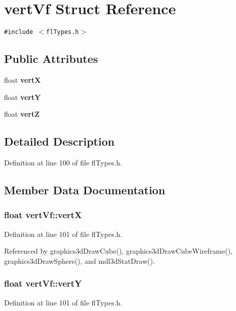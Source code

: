 \section{vert\-Vf Struct Reference}
\label{structvertVf}
{\tt \#include $<$fl\-Types.h$>$}

\subsection*{Public Attributes}
\begin{CompactItemize}
\item 
float {\bf vert\-X}
\item 
float {\bf vert\-Y}
\item 
float {\bf vert\-Z}
\end{CompactItemize}


\subsection{Detailed Description}




Definition at line 100 of file fl\-Types.h.

\subsection{Member Data Documentation}
\subsubsection{\setlength{\rightskip}{0pt plus 5cm}float {\bf vert\-Vf::vert\-X}}\label{structvertVf_4db56ecc20f234ed6f200065db2fe172}




Definition at line 101 of file fl\-Types.h.

Referenced by graphics3d\-Draw\-Cube(), graphics3d\-Draw\-Cube\-Wireframe(), graphics3d\-Draw\-Sphere(), and mdl3d\-Stat\-Draw().
\subsubsection{\setlength{\rightskip}{0pt plus 5cm}float {\bf vert\-Vf::vert\-Y}}\label{structvertVf_a6f88ddb095663d9a8ac12fa7ddb4c2c}




Definition at line 101 of file fl\-Types.h.

